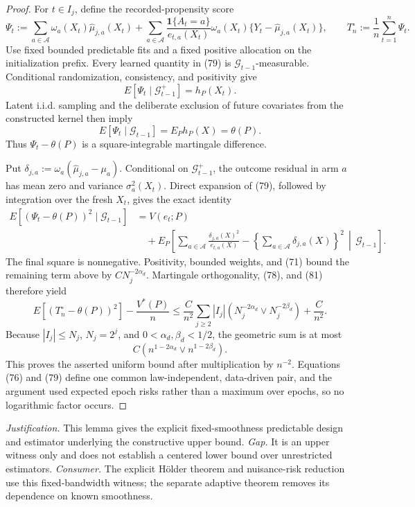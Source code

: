 \documentclass{article}
\begin{document}
\begin{proof}
For \(t\in I_j\), define the recorded-propensity score
\[
\Psi_t:=
\sum_{a\in\mathcal A}\omega_a(X_t)\widehat\mu_{j,a}(X_t)
+\sum_{a\in\mathcal A}
\frac{\mathbf1\{A_t=a\}}{e_{t,a}(X_t)}
\omega_a(X_t)\{Y_t-\widehat\mu_{j,a}(X_t)\},
\qquad
T_n^{\circ}:=\frac1n\sum_{t=1}^n\Psi_t.
\tag{79}
\]
Use fixed bounded predictable fits and a fixed positive allocation on the initialization prefix. Every learned quantity in (79) is \(\mathcal G_{t-1}\)-measurable. Conditional randomization, consistency, and positivity give
\[
E[\Psi_t\mid\mathcal G_{t-1}^{+}]=h_P(X_t).
\]
Latent i.i.d. sampling and the deliberate exclusion of future covariates from the constructed kernel then imply
\[
E[\Psi_t\mid\mathcal G_{t-1}]=E_Ph_P(X)=\theta(P).
\tag{80}
\]
Thus \(\Psi_t-\theta(P)\) is a square-integrable martingale difference.

Put \(\delta_{j,a}:=\omega_a(\widehat\mu_{j,a}-\mu_a)\). Conditional on \(\mathcal G_{t-1}^{+}\), the outcome residual in arm \(a\) has mean zero and variance \(\sigma_a^2(X_t)\). Direct expansion of (79), followed by integration over the fresh \(X_t\), gives the exact identity
\[
\begin{aligned}
E[(\Psi_t-\theta(P))^2\mid\mathcal G_{t-1}]
&=V(e_t;P)\\
&\quad+E_P\!\left[
\sum_{a\in\mathcal A}\frac{\delta_{j,a}(X)^2}{e_{t,a}(X)}
-\left\{\sum_{a\in\mathcal A}\delta_{j,a}(X)\right\}^2
\,\middle|\,\mathcal G_{t-1}\right].
\end{aligned}
\tag{81}
\]
The final square is nonnegative. Positivity, bounded weights, and (71) bound the remaining term above by \(CN_j^{-2\alpha_d}\). Martingale orthogonality, (78), and (81) therefore yield
\[
E[(T_n^{\circ}-\theta(P))^2]-\frac{V^*(P)}n
\leq\frac{C}{n^2}\sum_{j\geq2}|I_j|
\left(N_j^{-2\alpha_d}\vee N_j^{-2\beta_d}\right)
+\frac{C}{n^2}.
\]
Because \(|I_j|\leq N_j\), \(N_j=2^j\), and \(0<\alpha_d,\beta_d<1/2\), the geometric sum is at most
\[
C\left(n^{1-2\alpha_d}\vee n^{1-2\beta_d}\right).
\]
This proves the asserted uniform bound after multiplication by \(n^{-2}\). Equations (76) and (79) define one common law-independent, data-driven pair, and the argument used expected epoch risks rather than a maximum over epochs, so no logarithmic factor occurs.
\end{proof}
\par\smallskip\noindent \textit{Justification.} This lemma gives the explicit fixed-smoothness predictable design and estimator underlying the constructive upper bound. \textit{Gap.} It is an upper witness only and does not establish a centered lower bound over unrestricted estimators. \textit{Consumer.} The explicit Hölder theorem and nuisance-risk reduction use this fixed-bandwidth witness; the separate adaptive theorem removes its dependence on known smoothness.
\end{document}
